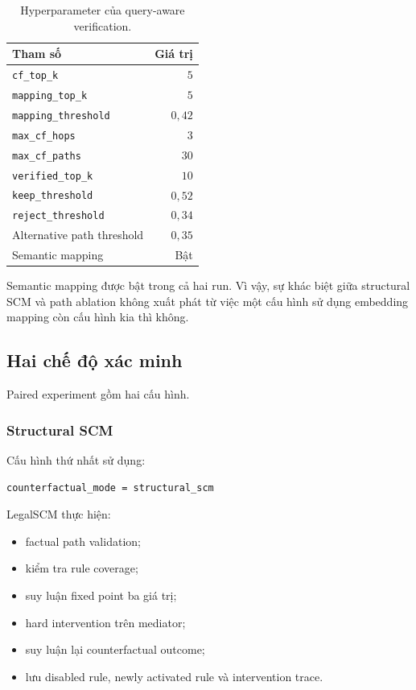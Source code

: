 \begin{table}[t]
    \centering
    \caption{Hyperparameter của query-aware verification.}
    \label{tab:verification-hyperparameters}
    \begin{tabular}{lr}
        \hline
        \textbf{Tham số} & \textbf{Giá trị} \\
        \hline
        \texttt{cf\_top\_k} & \(5\) \\
        \texttt{mapping\_top\_k} & \(5\) \\
        \texttt{mapping\_threshold} & \(0{,}42\) \\
        \texttt{max\_cf\_hops} & \(3\) \\
        \texttt{max\_cf\_paths} & \(30\) \\
        \texttt{verified\_top\_k} & \(10\) \\
        \texttt{keep\_threshold} & \(0{,}52\) \\
        \texttt{reject\_threshold} & \(0{,}34\) \\
        Alternative path threshold & \(0{,}35\) \\
        Semantic mapping & Bật \\
        \hline
    \end{tabular}
\end{table}

Semantic mapping được bật trong cả hai run. Vì vậy, sự khác biệt giữa
structural SCM và path ablation không xuất phát từ việc một cấu hình sử dụng
embedding mapping còn cấu hình kia thì không.

\subsection{Hai chế độ xác minh}

Paired experiment gồm hai cấu hình.

\subsubsection{Structural SCM}

Cấu hình thứ nhất sử dụng:

\begin{verbatim}
counterfactual_mode = structural_scm
\end{verbatim}

LegalSCM thực hiện:

\begin{itemize}
    \item factual path validation;
    \item kiểm tra rule coverage;
    \item suy luận fixed point ba giá trị;
    \item hard intervention trên mediator;
    \item suy luận lại counterfactual outcome;
    \item lưu disabled rule, newly activated rule và intervention trace.
\end{itemize}

